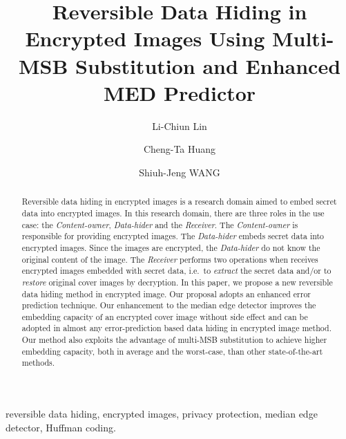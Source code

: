 \documentclass{elsarticle}
\begin{document}
	\begin{frontmatter}
	
		\title{Reversible Data Hiding in Encrypted Images Using Multi-MSB Substitution and Enhanced MED Predictor}
		
		\author[1]{Li-Chiun Lin}
		\author[2]{Cheng-Ta Huang}
		\author[1]{Shiuh-Jeng WANG}
			
		
		
		\begin{abstract}
			Reversible data hiding in encrypted images is a research domain aimed to embed secret data into encrypted images. 
			In this research domain, there are three roles in the use case: the \emph{Content-owner}, \emph{Data-hider} and the \emph{Receiver}.
			The \emph{Content-owner} is responsible for providing encrypted images.
			The \emph{Data-hider} embeds secret data into encrypted images. 
			Since the images are encrypted, the \emph{Data-hider} do not know the original content of the image. 
			The \emph{Receiver} performs two operations when receives encrypted images embedded with secret data, i.e.\ to \emph{extract} the secret data and/or to \emph{restore} original cover images by decryption.
			In this paper, we propose a new reversible data hiding method in encrypted image. 
			Our proposal adopts an enhanced error prediction technique. 
			Our enhancement to the median edge detector improves the embedding capacity of an encrypted cover image without side effect and can be adopted in almost any error-prediction based data hiding in encrypted image method.
			Our method also exploits the advantage of multi-MSB substitution to achieve higher embedding capacity, both in average and the worst-case, than other state-of-the-art methods.
		\end{abstract}
		
		\begin{keyword}
			reversible data hiding, encrypted images, privacy protection, median edge detector, Huffman coding.
		\end{keyword}
	\end{frontmatter}
	
\end{document}
